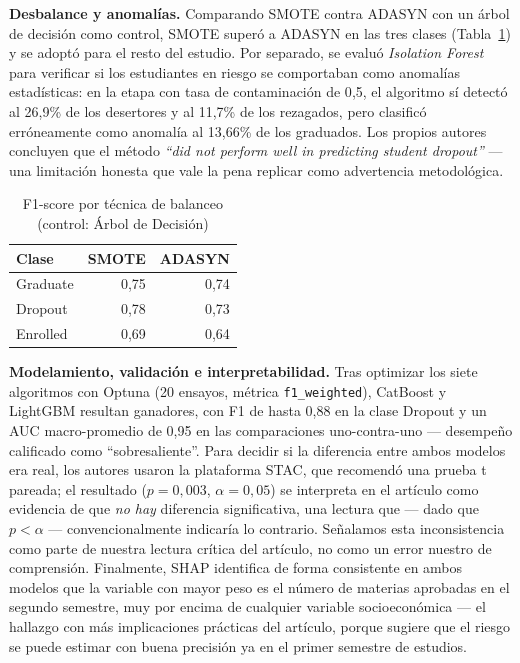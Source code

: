 \documentclass[11pt,a4paper]{article}
\begin{document}
\textbf{Desbalance y anomalías.} Comparando SMOTE contra ADASYN con un árbol de decisión como control, SMOTE superó a ADASYN en las tres clases (Tabla~\ref{tab:smote}) y se adoptó para el resto del estudio. Por separado, se evaluó \textit{Isolation Forest} para verificar si los estudiantes en riesgo se comportaban como anomalías estadísticas: en la etapa con tasa de contaminación de 0{,}5, el algoritmo sí detectó al 26{,}9\% de los desertores y al 11{,}7\% de los rezagados, pero clasificó erróneamente como anomalía al 13{,}66\% de los graduados. Los propios autores concluyen que el método \emph{``did not perform well in predicting student dropout''} --- una limitación honesta que vale la pena replicar como advertencia metodológica.

\begin{table}[h!]
\centering
\caption{F1-score por técnica de balanceo (control: Árbol de Decisión)}
\label{tab:smote}
\begin{tabular}{lrr}
\toprule
Clase & SMOTE & ADASYN \\
\midrule
Graduate & 0{,}75 & 0{,}74 \\
Dropout & 0{,}78 & 0{,}73 \\
Enrolled & 0{,}69 & 0{,}64 \\
\bottomrule
\end{tabular}
\end{table}

\textbf{Modelamiento, validación e interpretabilidad.} Tras optimizar los siete algoritmos con Optuna (20 ensayos, métrica \texttt{f1\_weighted}), CatBoost y LightGBM resultan ganadores, con F1 de hasta 0{,}88 en la clase Dropout y un AUC macro-promedio de 0{,}95 en las comparaciones uno-contra-uno --- desempeño calificado como ``sobresaliente''. Para decidir si la diferencia entre ambos modelos era real, los autores usaron la plataforma STAC, que recomendó una prueba t pareada; el resultado ($p=0{,}003$, $\alpha=0{,}05$) se interpreta en el artículo como evidencia de que \emph{no hay} diferencia significativa, una lectura que --- dado que $p<\alpha$ --- convencionalmente indicaría lo contrario. Señalamos esta inconsistencia como parte de nuestra lectura crítica del artículo, no como un error nuestro de comprensión. Finalmente, SHAP identifica de forma consistente en ambos modelos que la variable con mayor peso es el número de materias aprobadas en el segundo semestre, muy por encima de cualquier variable socioeconómica --- el hallazgo con más implicaciones prácticas del artículo, porque sugiere que el riesgo se puede estimar con buena precisión ya en el primer semestre de estudios.
\end{document}

